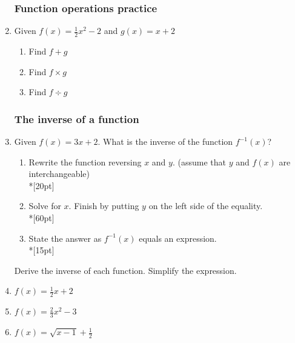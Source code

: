\documentclass[12pt, twoside]{article}
\begin{document}
\begin{enumerate}
      \subsubsection*{Function operations practice}
      \item Given $f(x)=\frac{1}{2}x^2-2$ and $g(x)=x+2$
      \begin{enumerate}
          \item Find $f + g$
          \item Find $f \times g$
          \item Find $f \div g$
      \end{enumerate}
    
    \newpage
    \subsubsection*{The inverse of a function}
    
      \item Given $f(x)=3x+2$. What is the inverse of the function $f^{-1} (x)$?
    
      \begin{enumerate}
          \item Rewrite the function reversing $x$ and $y$. (assume that $y$ and $f(x)$ are interchangeable)\\*[20pt]
          \item Solve for $x$. Finish by putting $y$ on the left side of the equality.\\*[60pt]
          \item State the answer as $f^{-1} (x)$ equals an expression.\\*[15pt]
      \end{enumerate}
    
      Derive the inverse of each function. Simplify the expression.
      \item   $f(x)=\frac{1}{2}x+2$
      \item   $f(x)=\frac{2}{3}x^2-3$
      \item   $f(x)=\sqrt{x-1}+\frac{1}{2}$
    
      \end{enumerate}
\end{document}
